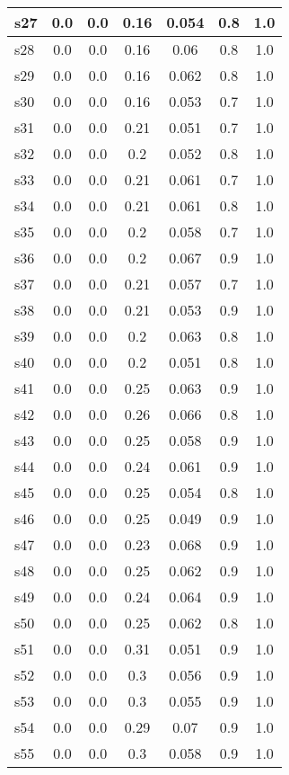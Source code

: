 \documentclass{article}
\begin{document}
\begin{tabular}{|l|c|c|c|c|c|c|}
\hline
s27 &0.0 & 0.0 & 0.16 & 0.054 & 0.8 & 1.0\\
\hline
s28 &0.0 & 0.0 & 0.16 & 0.06 & 0.8 & 1.0\\
\hline
s29 &0.0 & 0.0 & 0.16 & 0.062 & 0.8 & 1.0\\
\hline
s30 &0.0 & 0.0 & 0.16 & 0.053 & 0.7 & 1.0\\
\hline
s31 &0.0 & 0.0 & 0.21 & 0.051 & 0.7 & 1.0\\
\hline
s32 &0.0 & 0.0 & 0.2 & 0.052 & 0.8 & 1.0\\
\hline
s33 &0.0 & 0.0 & 0.21 & 0.061 & 0.7 & 1.0\\
\hline
s34 &0.0 & 0.0 & 0.21 & 0.061 & 0.8 & 1.0\\
\hline
s35 &0.0 & 0.0 & 0.2 & 0.058 & 0.7 & 1.0\\
\hline
s36 &0.0 & 0.0 & 0.2 & 0.067 & 0.9 & 1.0\\
\hline
s37 &0.0 & 0.0 & 0.21 & 0.057 & 0.7 & 1.0\\
\hline
s38 &0.0 & 0.0 & 0.21 & 0.053 & 0.9 & 1.0\\
\hline
s39 &0.0 & 0.0 & 0.2 & 0.063 & 0.8 & 1.0\\
\hline
s40 &0.0 & 0.0 & 0.2 & 0.051 & 0.8 & 1.0\\
\hline
s41 &0.0 & 0.0 & 0.25 & 0.063 & 0.9 & 1.0\\
\hline
s42 &0.0 & 0.0 & 0.26 & 0.066 & 0.8 & 1.0\\
\hline
s43 &0.0 & 0.0 & 0.25 & 0.058 & 0.9 & 1.0\\
\hline
s44 &0.0 & 0.0 & 0.24 & 0.061 & 0.9 & 1.0\\
\hline
s45 &0.0 & 0.0 & 0.25 & 0.054 & 0.8 & 1.0\\
\hline
s46 &0.0 & 0.0 & 0.25 & 0.049 & 0.9 & 1.0\\
\hline
s47 &0.0 & 0.0 & 0.23 & 0.068 & 0.9 & 1.0\\
\hline
s48 &0.0 & 0.0 & 0.25 & 0.062 & 0.9 & 1.0\\
\hline
s49 &0.0 & 0.0 & 0.24 & 0.064 & 0.9 & 1.0\\
\hline
s50 &0.0 & 0.0 & 0.25 & 0.062 & 0.8 & 1.0\\
\hline
s51 &0.0 & 0.0 & 0.31 & 0.051 & 0.9 & 1.0\\
\hline
s52 &0.0 & 0.0 & 0.3 & 0.056 & 0.9 & 1.0\\
\hline
s53 &0.0 & 0.0 & 0.3 & 0.055 & 0.9 & 1.0\\
\hline
s54 &0.0 & 0.0 & 0.29 & 0.07 & 0.9 & 1.0\\
\hline
s55 &0.0 & 0.0 & 0.3 & 0.058 & 0.9 & 1.0\\

\end{tabular}
\end{document}
